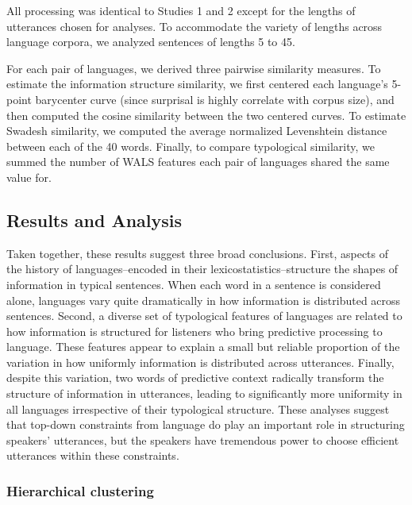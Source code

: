\documentclass[man,floatsintext]{apa6}
\begin{document}
All processing was identical to Studies 1 and 2 except for the lengths of utterances chosen for analyses. To accommodate the variety of lengths across language corpora, we analyzed sentences of lengths 5 to 45.

For each pair of languages, we derived three pairwise similarity measures. To estimate the information structure similarity, we first centered each language's 5-point barycenter curve (since surprisal is highly correlate with corpus size), and then computed the cosine similarity between the two centered curves. To estimate Swadesh similarity, we computed the average normalized Levenshtein distance between each of the 40 words. Finally, to compare typological similarity, we summed the number of WALS features each pair of languages shared the same value for.

\hypertarget{results-and-analysis}{%
\subsection{Results and Analysis}\label{results-and-analysis}}

Taken together, these results suggest three broad conclusions. First, aspects of the history of languages--encoded in their lexicostatistics--structure the shapes of information in typical sentences. When each word in a sentence is considered alone, languages vary quite dramatically in how information is distributed across sentences. Second, a diverse set of typological features of languages are related to how information is structured for listeners who bring predictive processing to language. These features appear to explain a small but reliable proportion of the variation in how uniformly information is distributed across utterances. Finally, despite this variation, two words of predictive context radically transform the structure of information in utterances, leading to significantly more uniformity in all languages irrespective of their typological structure. These analyses suggest that top-down constraints from language do play an important role in structuring speakers' utterances, but the speakers have tremendous power to choose efficient utterances within these constraints.

\hypertarget{hierarchical-clustering}{%
\subsubsection{Hierarchical clustering}\label{hierarchical-clustering}}
\end{document}

